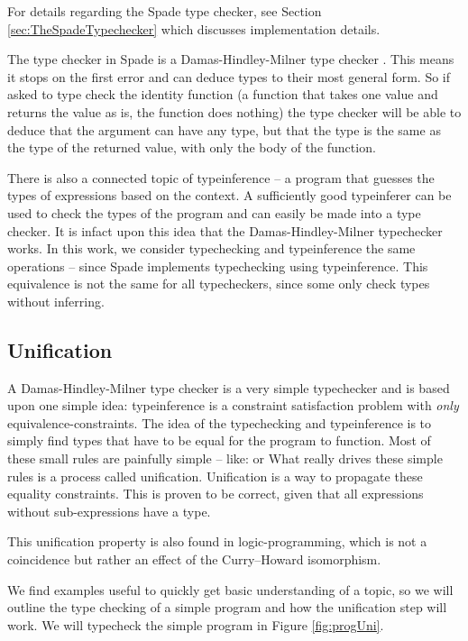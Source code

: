 For details regarding the Spade type checker, see Section \ref{sec:TheSpadeTypechecker} which discusses implementation details.

The type checker in Spade is a Damas-Hindley-Milner type checker \cite{src:DamasHindleyMilner}. This means it stops on the first error and can deduce types to their most general form. So if asked to type check the identity function (a function that takes one value and returns the value as is, the function does nothing) the type checker will be able to deduce that the argument can have any type, but that the type is the same as the type of the returned value, with only the body of the function.\cite{src:DamasHindleyMilner}

There is also a connected topic of typeinference -- a program that guesses the types of expressions based on the context. A sufficiently good typeinferer can be used to check the types of the program and can easily be made into a type checker. It is infact upon this idea that the Damas-Hindley-Milner typechecker works. In this work, we consider typechecking and typeinference the same operations -- since Spade implements typechecking using typeinference. This equivalence is not the same for all typecheckers, since some only check types without inferring.

\subsection{Unification}
\label{sec:Unification}
A Damas-Hindley-Milner type checker is a very simple typechecker and is based upon one simple idea: typeinference is a constraint satisfaction problem with \textit{only} equivalence-constraints. The idea of the typechecking and typeinference is to simply find types that have to be equal for the program to function. Most of these small rules are painfully simple -- like:  or  What really drives these simple rules is a process called unification. Unification is a way to propagate these equality constraints. This is proven to be correct, given that all expressions without sub-expressions have a type.

This unification property is also found in logic-programming, which is not a coincidence but rather an effect of the Curry–Howard isomorphism. \cite{src:curryHowardIso}

We find examples useful to quickly get basic understanding of a topic, so we will outline the type checking of a simple program and how the unification step will work. We will typecheck the simple program in Figure \ref{fig:progUni}.

